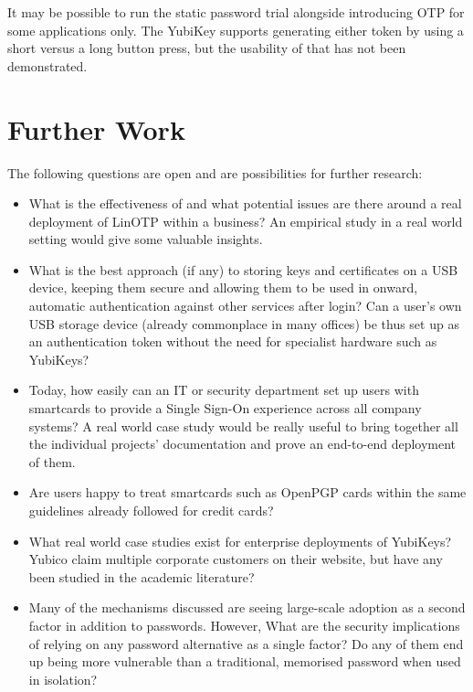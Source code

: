 \documentclass{report}
\begin{document}
It may be possible to run the static password trial alongside introducing OTP
for some applications only. The YubiKey supports generating either token
by using a short versus a long button press, but the usability of that has
not been demonstrated.

\chapter{Further Work}

The following questions are open and are possibilities for further research:

\begin{itemize}
\item What is the effectiveness of and what potential issues are there around
  a real deployment of LinOTP within a business? An empirical study in a
  real world setting would give some valuable insights.
\item What is the best approach (if any) to storing keys and certificates on
  a USB device, keeping them secure and allowing them to be used in onward,
  automatic authentication against other services after login? Can a user's
  own USB storage device (already commonplace in many offices) be thus set
  up as an authentication token without the need for specialist hardware
  such as YubiKeys?
\item Today, how easily can an IT or security department set up users with
  smartcards to provide a Single Sign-On experience across all company
  systems? A real world case study would be really useful to bring together
  all the individual projects' documentation and prove an end-to-end deployment
  of them.
\item Are users happy to treat smartcards such as OpenPGP cards within the
  same guidelines already followed for credit cards?
  \item What real world case studies exist for enterprise deployments of YubiKeys?
    Yubico claim multiple corporate customers on their website, but have any
    been studied in the academic literature?
\item Many of the mechanisms discussed are seeing large-scale
  adoption as a second factor in addition to passwords. However, What are the
  security implications of relying on any password alternative as a single factor?
  Do any of them end up being more vulnerable than a traditional, memorised
  password when used in isolation?
\end{itemize}

\printbibliography
\end{document}
